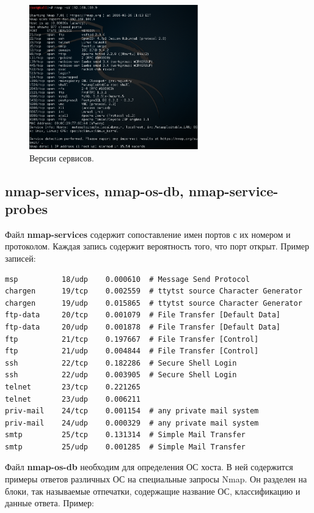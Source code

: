 \documentclass[10pt,a4paper]{article}
\begin{document}
\begin{figure}[h]
\begin{center}
\includegraphics[width=0.65\textwidth]{service_version}
\caption{Версии сервисов.}
\label{fig:service_version}
\end{center}
\end{figure}

\subsection{nmap-services, nmap-os-db, nmap-service-probes}
\label{files}

Файл \textbf{nmap-services} содержит сопоставление имен портов с их номером и протоколом. Каждая запись содержит вероятность того, что порт открыт. Пример записей:
\begin{verbatim}
msp          18/udp    0.000610  # Message Send Protocol
chargen      19/tcp    0.002559  # ttytst source Character Generator
chargen      19/udp    0.015865  # ttytst source Character Generator
ftp-data     20/tcp    0.001079  # File Transfer [Default Data]
ftp-data     20/udp    0.001878  # File Transfer [Default Data]
ftp          21/tcp    0.197667  # File Transfer [Control]
ftp          21/udp    0.004844  # File Transfer [Control]
ssh          22/tcp    0.182286  # Secure Shell Login
ssh          22/udp    0.003905  # Secure Shell Login
telnet       23/tcp    0.221265
telnet       23/udp    0.006211
priv-mail    24/tcp    0.001154  # any private mail system
priv-mail    24/udp    0.000329  # any private mail system
smtp         25/tcp    0.131314  # Simple Mail Transfer
smtp         25/udp    0.001285  # Simple Mail Transfer
\end{verbatim}


Файл \textbf{nmap-os-db} необходим для определения ОС хоста. В ней содержится примеры ответов различных ОС на специальные запросы Nmap. Он разделен на блоки, так называемые отпечатки, содержащие название ОС, классификацию и данные ответа. Пример:
\end{document}
